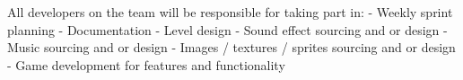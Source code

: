 All developers on the team will be responsible for taking part in:
\newline\indent - Weekly sprint planning
\newline\indent - Documentation
\newline\indent - Level design
\newline\indent - Sound effect sourcing and or design
\newline\indent - Music sourcing and or design
\newline\indent - Images / textures / sprites sourcing and or design
\newline\indent - Game development for features and functionality
